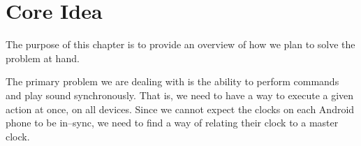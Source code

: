 \chapter{Core Idea} %

The purpose of this chapter is to provide an overview of how we plan to solve the problem at hand.



The primary problem we are dealing with is the ability to perform commands and play sound synchronously.
That is, we need to have a way to execute a given action at once, on all devices.
Since we cannot expect the clocks on each Android phone to be in--sync, we need to find a way of relating their clock to a master clock. 

